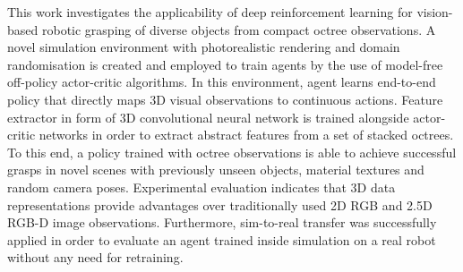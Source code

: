 This work investigates the applicability of deep reinforcement learning for vision-based robotic grasping of diverse objects from compact octree observations. A novel simulation environment with photorealistic rendering and domain randomisation is created and employed to train agents by the use of model-free off-policy actor-critic algorithms. In this environment, agent learns end-to-end policy that directly maps 3D visual observations to continuous actions. Feature extractor in form of 3D convolutional neural network is trained alongside actor-critic networks in order to extract abstract features from a set of stacked octrees. To this end, a policy trained with octree observations is able to achieve successful grasps in novel scenes with previously unseen objects, material textures and random camera poses. Experimental evaluation indicates that 3D data representations provide advantages over traditionally used 2D RGB and 2.5D RGB-D image observations. Furthermore, sim-to-real transfer was successfully applied in order to evaluate an agent trained inside simulation on a real robot without any need for retraining.
